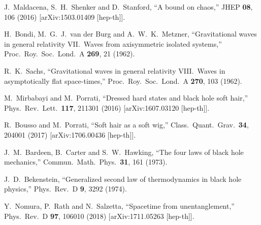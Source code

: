 \documentclass[12pt]{article}
\begin{document}
\begin{thebibliography}{99}
J.~Maldacena, S.~H.~Shenker and D.~Stanford,
``A bound on chaos,''
JHEP {\bf 08}, 106 (2016)
[arXiv:1503.01409 [hep-th]].

H.~Bondi, M.~G.~J.~van der Burg and A.~W.~K.~Metzner,
``Gravitational waves in general relativity VII.\ Waves from axisymmetric isolated systems,''
Proc.\ Roy.\ Soc.\ Lond.\ A {\bf 269}, 21 (1962).

R.~K.~Sachs,
``Gravitational waves in general relativity VIII.\ Waves in asymptotically flat space-times,''
Proc.\ Roy.\ Soc.\ Lond.\ A {\bf 270}, 103 (1962).

M.~Mirbabayi and M.~Porrati,
``Dressed hard states and black hole soft hair,''
Phys.\ Rev.\ Lett.\ {\bf 117}, 211301 (2016)
[arXiv:1607.03120 [hep-th]].

R.~Bousso and M.~Porrati,
``Soft hair as a soft wig,''
Class.\ Quant.\ Grav.\ {\bf 34}, 204001 (2017)
[arXiv:1706.00436 [hep-th]].

J.~M.~Bardeen, B.~Carter and S.~W.~Hawking,
``The four laws of black hole mechanics,''
Commun.\ Math.\ Phys.\ {\bf 31}, 161 (1973).

J.~D.~Bekenstein,
``Generalized second law of thermodynamics in black hole physics,''
Phys.\ Rev.\ D {\bf 9}, 3292 (1974).

Y.~Nomura, P.~Rath and N.~Salzetta,
``Spacetime from unentanglement,''
Phys.\ Rev.\ D {\bf 97}, 106010 (2018)
[arXiv:1711.05263 [hep-th]].

\end{thebibliography}
\end{document}
